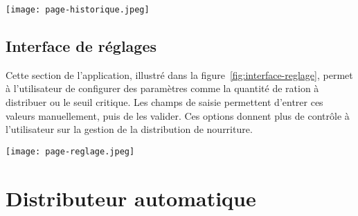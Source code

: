\begin{minipage}{\linewidth}
  \centering
  \texttt{[image: page-historique.jpeg]}
  \label{fig:interface-historique}
\end{minipage}

\subsection{Interface de réglages}
Cette section de l’application, illustré dans la figure~\ref{fig:interface-reglage}, permet à l’utilisateur de configurer des paramètres comme la quantité de ration à distribuer ou le seuil critique. Les champs de saisie permettent d’entrer ces valeurs manuellement, puis de les valider. Ces options donnent plus de contrôle à l'utilisateur sur la gestion de la distribution de nourriture.

\begin{minipage}{\linewidth}
  \centering
  \texttt{[image: page-reglage.jpeg]}
  \label{fig:interface-reglage}
\end{minipage}

\section{Distributeur automatique}